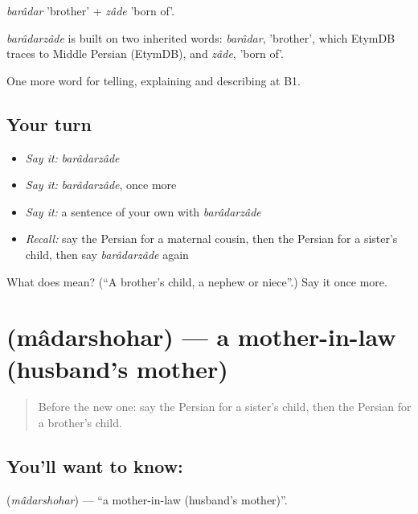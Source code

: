 \emph{barâdar} 'brother' + \emph{zâde} 'born of'.

\begin{cousinweb}
\emph{barâdarzâde} is built on two inherited words: \emph{barâdar}, 'brother', which EtymDB traces to Middle Persian (EtymDB), and \emph{zâde}, 'born of'.
\end{cousinweb}

\begin{grammarlens}[title={What you've built}]
One more word for telling, explaining and describing at B1.
\end{grammarlens}

\subsection*{Your turn}
\begin{itemize}
\raggedright
  \item \emph{Say it:} \emph{barâdarzâde}
  \item \emph{Say it:} \emph{barâdarzâde}, once more
  \item \emph{Say it:} a sentence of your own with \emph{barâdarzâde}
  \item \emph{Recall:} say the Persian for a maternal cousin, then the Persian for a sister's child, then say \emph{barâdarzâde} again
\end{itemize}

\begin{tcolorbox}[breakable,colback=teal!4,colframe=teal!35!black,title={Before you move on}]
What does  mean? (\textquotedblleft{}A brother's child, a nephew or niece\textquotedblright{}.) Say it once more.
\end{tcolorbox}
\section[\texorpdfstring{\fa{مادرشوهر} (mâdarshohar)}{مادرشوهر (mâdarshohar)}]{ (mâdarshohar) — a mother-in-law (husband's mother)}

\label{lesson:FA-C501-madarshohar}



\begin{quote}
Before the new one: say the Persian for a sister's child, then the Persian for a brother's child.
\end{quote}

\subsection*{You'll want to know: }
\textbf{} (\emph{mâdarshohar}) — \textquotedblleft{}a mother-in-law (husband's mother)\textquotedblright{}.

